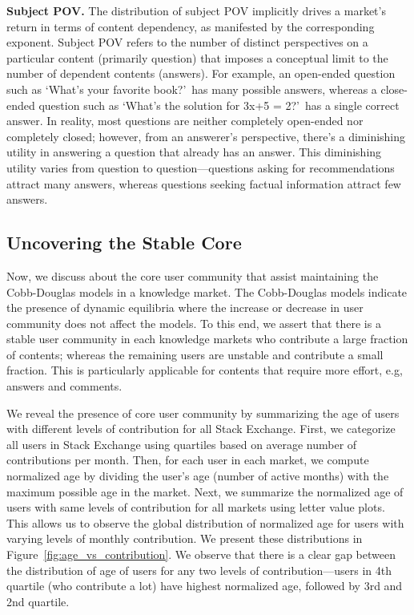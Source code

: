 \textbf{Subject POV.} The distribution of subject POV implicitly drives a market's return in terms of content dependency, as manifested by the corresponding exponent. Subject POV refers to the number of distinct perspectives on a particular content (primarily question) that imposes a conceptual limit to the number of dependent contents (answers). For example, an open-ended question such as \lq What's your favorite book?\rq\ has many possible answers, whereas a close-ended question such as \lq What's the solution for 3x+5 = 2?\rq\ has a single correct answer. In reality, most questions are neither completely open-ended nor completely closed; however, from an answerer's perspective, there's a diminishing utility in answering a question that already has an answer. This diminishing utility varies from question to question---questions asking for recommendations attract many answers, whereas questions seeking factual information attract few answers. 

\subsection{Uncovering the Stable Core} 
Now, we discuss about the core user community that assist maintaining the Cobb-Douglas models in a knowledge market. The Cobb-Douglas models indicate the presence of dynamic equilibria where the increase or decrease in user community does not affect the models. To this end, we assert that there is a stable user community in each knowledge markets who contribute a large fraction of contents; whereas the remaining users are unstable and contribute a small fraction. This is particularly applicable for contents that require more effort, e.g, answers and comments. 

We reveal the presence of core user community by summarizing the age of users with different levels of contribution for all Stack Exchange. First, we categorize all users in Stack Exchange using quartiles based on average number of contributions per month. Then, for each user in each market, we compute normalized age by dividing the user's age (number of active months) with the maximum possible age in the market. Next, we summarize the normalized age of users with same levels of contribution for all markets using letter value plots. This allows us to observe the global distribution of normalized age for users with varying levels of monthly contribution. We present these distributions in Figure~\ref{fig:age_vs_contribution}. We observe that there is a clear gap between the distribution of age of users for any two levels of contribution---users in 4th quartile (who contribute a lot) have highest normalized age, followed by 3rd and 2nd quartile. 

